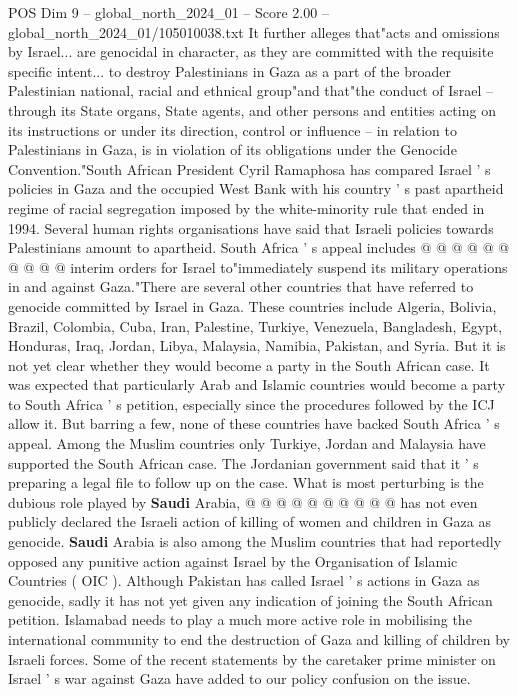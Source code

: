 \begin{textsample}{POS Dim 9 – global\_north\_2024\_01 – Score 2.00 – global\_north\_2024\_01/105010038.txt}
It further alleges that"acts and omissions by Israel... are genocidal in character, as they are committed with the requisite specific intent... to destroy Palestinians in Gaza as a part of the broader Palestinian national, racial and ethnical group"and that"the conduct of Israel -- through its State organs, State agents, and other persons and entities acting on its instructions or under its direction, control or influence -- in relation to Palestinians in Gaza, is in violation of its obligations under the Genocide Convention."South African President Cyril Ramaphosa has compared Israel ' s policies in Gaza and the occupied West Bank with his country ' s past apartheid regime of racial segregation imposed by the white-minority rule that ended in 1994.
Several human rights organisations have said that Israeli policies towards Palestinians amount to apartheid.
South Africa ' s appeal includes @ @ @ @ @ @ @ @ @ @ interim orders for Israel to"immediately suspend its military operations in and against Gaza."There are several other countries that have referred to genocide committed by Israel in Gaza.
These countries include Algeria, Bolivia, Brazil, Colombia, Cuba, Iran, Palestine, Turkiye, Venezuela, Bangladesh, Egypt, Honduras, Iraq, Jordan, Libya, Malaysia, Namibia, Pakistan, and Syria.
But it is not yet clear whether they would become a party in the South African case.
It was expected that particularly Arab and Islamic countries would become a party to South Africa ' s petition, especially since the procedures followed by the ICJ allow it.
But barring a few, none of these countries have backed South Africa ' s appeal.
Among the Muslim countries only Turkiye, Jordan and Malaysia have supported the South African case.
The Jordanian government said that it ' s preparing a legal file to follow up on the case.
What is most perturbing is the dubious role played by \textbf{Saudi} Arabia, @ @ @ @ @ @ @ @ @ @ has not even publicly declared the Israeli action of killing of women and children in Gaza as genocide. \textbf{Saudi} Arabia is also among the Muslim countries that had reportedly opposed any punitive action against Israel by the Organisation of Islamic Countries ( OIC ).
Although Pakistan has called Israel ' s actions in Gaza as genocide, sadly it has not yet given any indication of joining the South African petition.
Islamabad needs to play a much more active role in mobilising the international community to end the destruction of Gaza and killing of children by Israeli forces.
Some of the recent statements by the caretaker prime minister on Israel ' s war against Gaza have added to our policy confusion on the issue.

\end{textsample}
